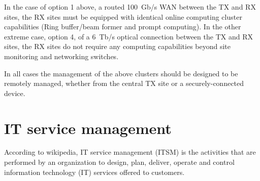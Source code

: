 \documentclass[12pt,a4paper]{article}
\begin{document}
In the case of option 1 above, a routed 100~Gb/s WAN between the TX and RX sites, the RX sites must be equipped with identical online computing cluster capabilities (Ring buffer/beam former and prompt computing).
In the other extreme case, option 4, of a 6~Tb/s optical connection between the TX and RX sites, the RX sites do not require any computing capabilities beyond site monitoring and networking switches.

In all cases the management of the above clusters should be designed to be remotely managed, whether from the central TX site or a securely-connected device.




\section{IT service management} \label{sec:itsm}

According to wikipedia, IT service management (ITSM) is the activities that are performed by an organization to design, plan, deliver, operate and control information technology (IT) services offered to customers. 
\end{document}
